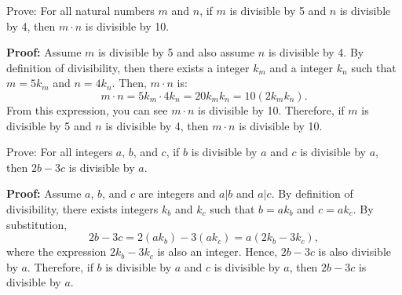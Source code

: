 \begin{questions}
\smallskip
{}

\fi



 Prove: For all natural numbers $m$ and $n$, if $m$ is divisible by 5 and $n$ is divisible by 4, then $m\cdot n$ is divisible by 10.
    \ifprintanswers
        \vspace{-10pt}
    \fi
  \begin{solution} \textbf{Proof:} Assume $m$ is divisible by 5 and also assume $n$ is divisible by 4.  By definition of divisibility, then there exists a integer $k_m$ and a integer $k_n$ such that $m = 5k_m$ and $n=4k_n$.  Then, $m\cdot n$ is:
    \[ m\cdot n = 5k_m \cdot 4k_n = 20k_mk_n = 10(2k_mk_n). \]
  From this expression, you can see $m\cdot n$ is divisible by 10.  Therefore, if $m$ is divisible by 5 and $n$ is divisible by 4, then $m \cdot n$ is divisible by 10.
  \end{solution}



 Prove: For all integers $a$, $b$, and $c$, if $b$ is divisible by $a$ and $c$ is divisible by $a$, then $2b - 3c$ is divisible by $a$.
    \ifprintanswers
        \vspace{-10pt}
    \fi
  \begin{solution} \textbf{Proof:} Assume $a$, $b$, and $c$ are integers and $a | b$ and $a | c$.  By definition of divisibility, there exists integers $k_b$ and $k_c$ such that $b = ak_b$ and $c = ak_c$.  By substitution,
    \[ 2b - 3c = 2(ak_b) - 3(ak_c) = a(2k_b - 3k_c), \]
  where the expression $2k_b - 3k_c$ is also an integer.  Hence, $2b - 3c$ is also divisible by $a$.  Therefore, if $b$ is divisible by $a$ and $c$ is divisible by $a$, then $2b-3c$ is divisible by $a$.
  \end{solution}



\end{questions}
